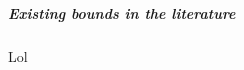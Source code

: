 \documentclass[../main.tex]{subfiles}
\begin{document}
\subparagraph{Existing bounds in the literature}\label{subpar1.1.1.1.1}
Lol
\end{document}

